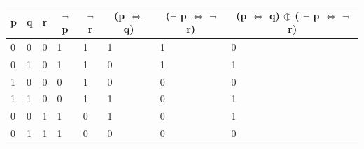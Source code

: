 \documentclass[a4 paper]{article}
\numberwithin{equation}{section}
\newcommand{\0}{\mathbf{0}}
\begin{document}
\begin{table}[h!]
\begin{tabular}{|l|l|l|l|l|l|l|l|}
\hline
\multicolumn{1}{|c|}{\textbf{p}} & \multicolumn{1}{c|}{\textbf{q}} & \multicolumn{1}{c|}{\textbf{r}} & \multicolumn{1}{c|}{\textbf{$\neg$ p}} & \multicolumn{1}{c|}{\textbf{$\neg$ r}} & \multicolumn{1}{c|}{\textbf{(p $\iff$ q)}} & \multicolumn{1}{c|}{\textbf{($\neg$ p $\iff$ $\neg$ r)}} & \multicolumn{1}{c|}{\textbf{(p $\iff$ q) $\oplus$ ( $\neg$ p $\iff$ $\neg$ r)}} \\ \hline
0                                & 0                               & 0                               & 1                                & 1                                & 1                                     & 1                                         & 0                                    \\ \hline
0                                & 1                               & 0                               & 1                                & 1                                & 0                                     & 1                                         & 1                                    \\ \hline
1                                & 0                               & 0                               & 0                                & 1                                & 0                                     & 0                                         & 0                                    \\ \hline
1                                & 1                               & 0                               & 0                                & 1                                & 1                                     & 0                                         & 1                                    \\ \hline
0                                & 0                               & 1                               & 1                                & 0                                & 1                                     & 0                                         & 1                                    \\ \hline
0                                & 1                               & 1                               & 1                                & 0                                & 0                                     & 0                                         & 0                                    \\ \hline

\end{tabular}
\end{table}
\end{document}
